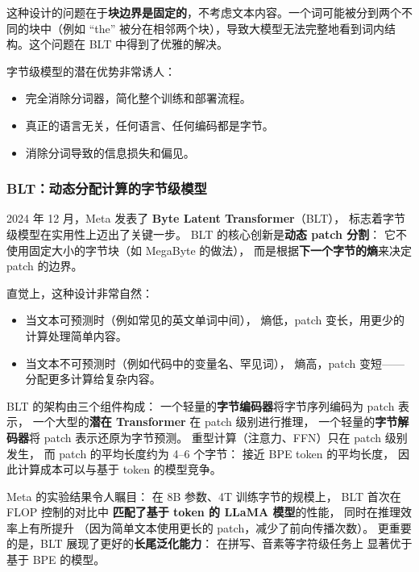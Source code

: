 这种设计的问题在于\textbf{块边界是固定的}，不考虑文本内容。一个词可能被分到两个不同的块中（例如 “th\textbar e” 被分在相邻两个块），导致大模型无法完整地看到词内结构。这个问题在 BLT 中得到了优雅的解决。

字节级模型的潜在优势非常诱人：
\begin{itemize}[noitemsep]
  \item 完全消除分词器，简化整个训练和部署流程。
  \item 真正的语言无关，任何语言、任何编码都是字节。
  \item 消除分词导致的信息损失和偏见。
\end{itemize}

\subsubsection{BLT：动态分配计算的字节级模型}

2024 年 12 月，Meta 发表了 \textbf{Byte Latent Transformer}（BLT），
标志着字节级模型在实用性上迈出了关键一步。
BLT 的核心创新是\textbf{动态 patch 分割}：
它不使用固定大小的字节块（如 MegaByte 的做法），
而是根据\textbf{下一个字节的熵}来决定 patch 的边界。

直觉上，这种设计非常自然：
\begin{itemize}[noitemsep]
  \item 当文本可预测时（例如常见的英文单词中间），
        熵低，patch 变长，用更少的计算处理简单内容。
  \item 当文本不可预测时（例如代码中的变量名、罕见词），
        熵高，patch 变短——分配更多计算给复杂内容。
\end{itemize}

BLT 的架构由三个组件构成：
一个轻量的\textbf{字节编码器}将字节序列编码为 patch 表示，
一个大型的\textbf{潜在 Transformer} 在 patch 级别进行推理，
一个轻量的\textbf{字节解码器}将 patch 表示还原为字节预测。
重型计算（注意力、FFN）只在 patch 级别发生，
而 patch 的平均长度约为 4--6 个字节：
接近 BPE token 的平均长度，
因此计算成本可以与基于 token 的模型竞争。

Meta 的实验结果令人瞩目：
在 8B 参数、4T 训练字节的规模上，
BLT 首次在 FLOP 控制的对比中
\textbf{匹配了基于 token 的 LLaMA 模型}的性能，
同时在推理效率上有所提升
（因为简单文本使用更长的 patch，减少了前向传播次数）。
更重要的是，BLT 展现了更好的\textbf{长尾泛化能力}：
在拼写、音素等字符级任务上
显著优于基于 BPE 的模型。

